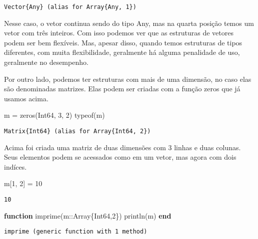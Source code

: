 \documentclass[
  letterpaper,
  DIV=11,
  numbers=noendperiod]{scrreprt}
\newenvironment{Shaded}{\begin{snugshade}}{\end{snugshade}}
\newcommand{\DataTypeTok}[1]{\textcolor[rgb]{0.68,0.00,0.00}{#1}}
\newcommand{\FloatTok}[1]{\textcolor[rgb]{0.68,0.00,0.00}{#1}}
\newcommand{\FunctionTok}[1]{\textcolor[rgb]{0.28,0.35,0.67}{#1}}
\newcommand{\KeywordTok}[1]{\textcolor[rgb]{0.00,0.23,0.31}{\textbf{#1}}}
\newcommand{\NormalTok}[1]{\textcolor[rgb]{0.00,0.23,0.31}{#1}}
\newcommand{\OperatorTok}[1]{\textcolor[rgb]{0.37,0.37,0.37}{#1}}
\begin{document}
\begin{verbatim}
Vector{Any} (alias for Array{Any, 1})
\end{verbatim}

Nesse caso, o vetor continua sendo do tipo Any, mas na quarta posição
temos um vetor com três inteiros. Com isso podemos ver que as estruturas
de vetores podem ser bem flexíveis. Mas, apesar disso, quando temos
estruturas de tipos diferentes, com muita flexibilidade, geralmente há
alguma penalidade de uso, geralmente no desempenho.

Por outro lado, podemos ter estruturas com mais de uma dimensão, no caso
elas são denominadas matrizes. Elas podem ser criadas com a função zeros
que já usamos acima.

\begin{Shaded}
\begin{Highlighting}[]
\NormalTok{m }\OperatorTok{=} \FunctionTok{zeros}\NormalTok{(}\DataTypeTok{Int64}\NormalTok{, }\FloatTok{3}\NormalTok{, }\FloatTok{2}\NormalTok{)}
\FunctionTok{typeof}\NormalTok{(m)}
\end{Highlighting}
\end{Shaded}

\begin{verbatim}
Matrix{Int64} (alias for Array{Int64, 2})
\end{verbatim}

Acima foi criada uma matriz de duas dimensões com 3 linhas e duas
colunas. Seus elementos podem se acessados como em um vetor, mas agora
com dois indíces.

\begin{Shaded}
\begin{Highlighting}[]
\NormalTok{m[}\FloatTok{1}\NormalTok{, }\FloatTok{2}\NormalTok{]  }\OperatorTok{=} \FloatTok{10}
\end{Highlighting}
\end{Shaded}

\begin{verbatim}
10
\end{verbatim}

\begin{Shaded}
\begin{Highlighting}[]
\KeywordTok{function} \FunctionTok{imprime}\NormalTok{(m}\OperatorTok{::}\DataTypeTok{Array\{Int64,2\}}\NormalTok{)}
    \FunctionTok{println}\NormalTok{(m)}
\KeywordTok{end}
\end{Highlighting}
\end{Shaded}

\begin{verbatim}
imprime (generic function with 1 method)
\end{verbatim}
\end{document}
